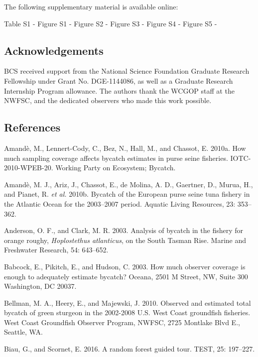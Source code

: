 \documentclass[]{article}
\begin{document}
The following supplementary material is available online:

Table S1 - Figure S1 - Figure S2 - Figure S3 - Figure S4 - Figure S5 -

\subsection{Acknowledgements}\label{acknowledgements}

BCS received support from the National Science Foundation Graduate
Research Fellowship under Grant No. DGE-1144086, as well as a Graduate
Research Internship Program allowance. The authors thank the WCGOP staff
at the NWFSC, and the dedicated observers who made this work possible.

\subsection{References}\label{references}

\hypertarget{refs}{}
\hypertarget{ref-amande2010b}{}
Amandè, M., Lennert-Cody, C., Bez, N., Hall, M., and Chassot, E. 2010a.
How much sampling coverage affects bycatch estimates in purse seine
fisheries. IOTC-2010-WPEB-20. Working Party on Ecosystem; Bycatch.

\hypertarget{ref-amande2010a}{}
Amandè, M. J., Ariz, J., Chassot, E., de Molina, A. D., Gaertner, D.,
Murua, H., and Pianet, R. \emph{et al.} 2010b. Bycatch of the European
purse seine tuna fishery in the Atlantic Ocean for the 2003--2007
period. Aquatic Living Resources, 23: 353--362.

\hypertarget{ref-anderson2003}{}
Anderson, O. F., and Clark, M. R. 2003. Analysis of bycatch in the
fishery for orange roughy, \emph{Hoplostethus atlanticus}, on the South
Tasman Rise. Marine and Freshwater Research, 54: 643--652.

\hypertarget{ref-babcock2003}{}
Babcock, E., Pikitch, E., and Hudson, C. 2003. How much observer
coverage is enough to adequately estimate bycatch? Oceana, 2501 M
Street, NW, Suite 300 Washington, DC 20037.

\hypertarget{ref-bellman2010}{}
Bellman, M. A., Heery, E., and Majewski, J. 2010. Observed and estimated
total bycatch of green sturgeon in the 2002-2008 U.S. West Coast
groundfish fisheries. West Coast Groundfish Observer Program, NWFSC,
2725 Montlake Blvd E., Seattle, WA.

\hypertarget{ref-biau2016}{}
Biau, G., and Scornet, E. 2016. A random forest guided tour. TEST, 25:
197--227.
\end{document}
